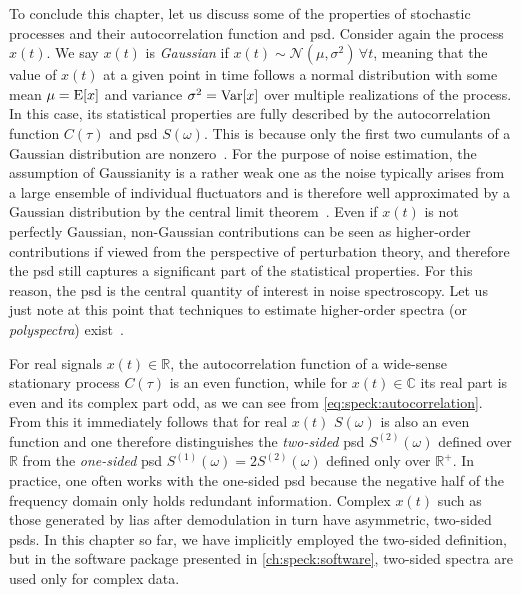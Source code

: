 To conclude this chapter, let us discuss some of the properties of stochastic processes and their autocorrelation function and \gls{psd}.
Consider again the process $x(t)$.
We say $x(t)$ is \emph{Gaussian} if $x(t)\sim\mathcal{N}(\mu, \sigma^2)\,\forall t$, meaning that the value of $x(t)$ at a given point in time follows a normal distribution with some mean $\mu = \operatorname{E}[x]$ and variance $\sigma^2=\operatorname{Var}[x]$ over multiple realizations of the process.
In this case, its statistical properties are fully described by the autocorrelation function $C(\tau)$ and \gls{psd} $S(\omega)$.
This is because only the first two cumulants of a Gaussian distribution are nonzero~\cite{Fox1978}.
For the purpose of noise estimation, the assumption of Gaussianity is a rather weak one as the noise typically arises from a large ensemble of individual fluctuators and is therefore well approximated by a Gaussian distribution by the central limit theorem~\cite{Krzywda2020}.
Even if $x(t)$ is not perfectly Gaussian, non-Gaussian contributions can be seen as higher-order contributions if viewed from the perspective of perturbation theory, and therefore the \gls{psd} still captures a significant part of the statistical properties.
For this reason, the \gls{psd} is the central quantity of interest in noise spectroscopy.
Let us just note at this point that techniques to estimate higher-order spectra (or \emph{polyspectra}) exist~\cite{Nikias1993,Chandran1994,Norris2016,Szankowski2017}.

For real signals $x(t)\in\mathbb{R}$, the autocorrelation function of a wide-sense stationary process $C(\tau)$ is an even function, while for $x(t)\in\mathbb{C}$ its real part is even and its complex part odd, as we can see from \cref{eq:speck:autocorrelation}.
From this it immediately follows that for real $x(t)$ $S(\omega)$ is also an even function and one therefore distinguishes the \emph{two-sided} \gls{psd} $S^{(2)}(\omega)$ defined over $\mathbb{R}$ from the \emph{one-sided} \gls{psd} $S^{(1)}(\omega) = 2 S^{(2)}(\omega)$ defined only over $\mathbb{R}^+$.
In practice, one often works with the one-sided \gls{psd} because the negative half of the frequency domain only holds redundant information.
Complex $x(t)$ such as those generated by \glspl{lia} after demodulation in turn have asymmetric, two-sided \glspl{psd}.
In this chapter so far, we have implicitly employed the two-sided definition, but in the software package presented in \cref{ch:speck:software}, two-sided spectra are used only for complex data.
